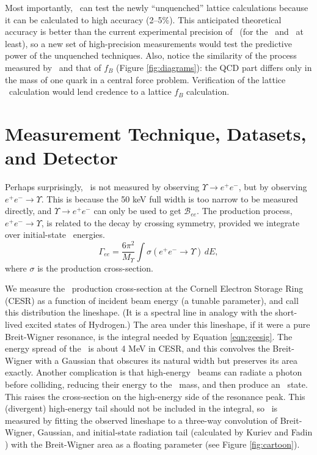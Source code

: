 \documentclass[aps,prd,preprint,superscriptaddress,tightenlines,nofootinbib,floatfix]{revtex4}
\begin{document}
Most importantly, \gee\ can test the newly ``unquenched'' lattice
calculations \cite{davies} because it can be calculated to high
accuracy (2--5\%).  This anticipated theoretical accuracy is better
than the current experimental precision of \gee\ (for the \utwo\ and
\uthree\ at least), so a new set of high-precision measurements would
test the predictive power of the unquenched techniques.  Also, notice
the similarity of the process measured by \gee\ and that of $f_B$
(Figure \ref{fig:diagrams}): the QCD part differs only in the mass of
one quark in a central force problem.  Verification of the lattice
\gee\ calculation would lend credence to a lattice $f_B$ calculation.

%
\section{Measurement Technique, Datasets, and Detector}
%

Perhaps surprisingly, \gee\ is not measured by observing $\Upsilon \to
e^+e^-$, but by observing $e^+e^- \to \Upsilon$.  This is because the
50 keV full width is too narrow to be measured directly, and $\Upsilon
\to e^+e^-$ can only be used to get $\mathcal{B}_{ee}$.  The
production process, $e^+e^- \to \Upsilon$, is related to the decay by
crossing symmetry, provided we integrate over initial-state \ee\
energies.
\begin{equation}
  \Gamma_{ee} = \frac{6\pi^2}{M_\Upsilon} \int \sigma(e^+e^- \to
  \Upsilon) \, dE, \label{eqn:geesig}
\end{equation}
where $\sigma$ is the production cross-section.

We measure the \ups\ production cross-section at the Cornell Electron
Storage Ring (CESR) as a function of incident beam energy (a tunable
parameter), and call this distribution the lineshape.  (It is a
spectral line in analogy with the short-lived excited states of
Hydrogen.)  The area under this lineshape, if it were a pure
Breit-Wigner resonance, is the integral needed by Equation
\ref{eqn:geesig}.  The energy spread of the \ee\ is about 4 MeV in
CESR, and this convolves the Breit-Wigner with a Gaussian that
obscures its natural width but preserves its area exactly.  Another
complication is that high-energy \ee\ beams can radiate a photon
before colliding, reducing their energy to the \ups\ mass, and then
produce an \ups\ state.  This raises the cross-section on the
high-energy side of the resonance peak.  This (divergent) high-energy
tail should not be included in the integral, so \gee\ is measured by
fitting the observed lineshape to a three-way convolution of
Breit-Wigner, Gaussian, and initial-state radiation tail (calculated
by Kuriev and Fadin \cite{kf}) with the Breit-Wigner area as a
floating parameter (see Figure \ref{fig:cartoon}).
\end{document}
